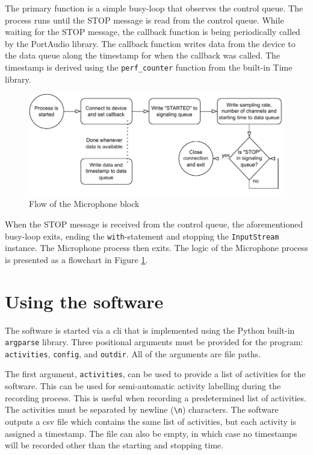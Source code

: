 The primary function is a simple busy-loop that observes the control queue.
The process runs until the STOP message is read from the control queue.
While waiting for the STOP message,
the callback function is being periodically called by the PortAudio library.
The callback function writes data from the device to the data queue along the timestamp for when the callback was called.
The timestamp is derived using the \texttt{perf\_counter} function from the built-in Time library.

\begin{figure}[H]
    \centering
    \includegraphics[width=\textwidth]{fig/3/mic-flowchart.pdf}
    \caption{Flow of the Microphone block}
    \label{fig:mic-flowchart}
\end{figure}

When the STOP message is received from the control queue,
the aforementioned busy-loop exits, ending the \texttt{with}-statement and stopping the \texttt{InputStream} instance.
The Microphone process then exits.
The logic of the Microphone process is presented as a flowchart in Figure \ref{fig:mic-flowchart}.

\section{Using the software}
\label{sec:3-usage}
The software is started via a \gls{cli} that is implemented using the Python built-in \texttt{argparse} library.
Three positional arguments must be provided for the program: \texttt{activities}, \texttt{config}, and \texttt{outdir}.
All of the arguments are file paths.

The first argument, \texttt{activities}, can be used to provide a list of activities for the software.
This can be used for semi-automatic activity labelling during the recording process.
This is useful when recording a predetermined list of activities.
The activities must be separated by newline (\texttt{\textbackslash n}) characters.
The software outputs a \gls{csv} file which contains the same list of activities,
but each activity is assigned a timestamp.
The file can also be empty, in which case no timestamps will be recorded other than the starting and stopping time.


